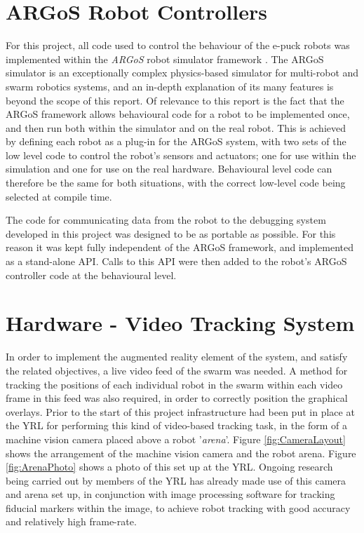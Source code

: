 \section{ARGoS Robot Controllers}
For this project, all code used to control the behaviour of the e-puck robots was implemented within the \textit{ARGoS} robot simulator framework \cite{ARGoS}. The ARGoS simulator is an exceptionally complex physics-based simulator for multi-robot and swarm robotics systems, and an in-depth explanation of its many features is beyond the scope of this report. Of relevance to this report is the fact that the ARGoS framework allows behavioural code for a robot to be implemented once, and then run both within the simulator and on the real robot. This is achieved by defining each robot as a plug-in for the ARGoS system, with two sets of the low level code to control the robot's sensors and actuators; one for use within the simulation and one for use on the real hardware. Behavioural level code can therefore be the same for both situations, with the correct low-level code being selected at compile time.

The code for communicating data from the robot to the debugging system developed in this project was designed to be as portable as possible. For this reason it was kept fully independent of the ARGoS framework, and implemented as a stand-alone API. Calls to this API were then added to the robot's ARGoS controller code at the behavioural level.



\section{Hardware - Video Tracking System} \label{TrackingHardware}

In order to implement the augmented reality element of the system, and satisfy the related objectives, a live video feed of the swarm was needed. A method for tracking the positions of each individual robot in the swarm within each video frame in this feed was also required, in order to correctly position the graphical overlays. Prior to the start of this project infrastructure had been put in place at the YRL for performing this kind of video-based tracking task, in the form of a machine vision camera placed above a robot '\textit{arena}'. Figure \ref{fig:CameraLayout} shows the arrangement of the machine vision camera and the robot arena. Figure \ref{fig:ArenaPhoto} shows a photo of this set up at the YRL. Ongoing research being carried out by members of the YRL has already made use of this camera and arena set up, in conjunction with image processing software for tracking fiducial markers within the image, to achieve robot tracking with good accuracy and relatively high frame-rate.

